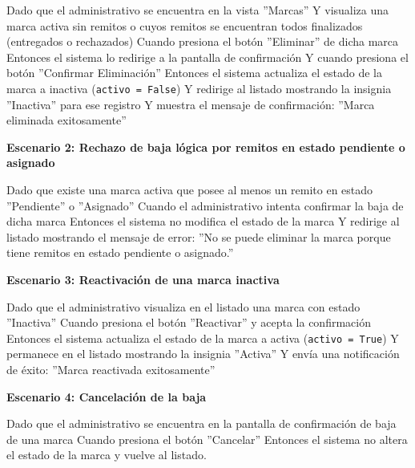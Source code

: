 \documentclass[a4paper,9pt]{article}
\begin{document}
\begin{tcolorbox}[hucard, title={\textbf{HU-242: ELIMINAR MARCA} \hfill \scriptsize \colorbox{slatestatus}{\textbf{\ Done\ }} \quad \colorbox{white}{\textcolor{primarydark}{\textbf{\ 3 pts\ }}}}]
{Dado que el administrativo se encuentra en la vista ''Marcas'' Y visualiza una marca activa sin remitos o cuyos remitos se encuentran todos finalizados (entregados o rechazados) Cuando presiona el botón ''Eliminar'' de dicha marca Entonces el sistema lo redirige a la pantalla de confirmación Y cuando presiona el botón ''Confirmar Eliminación'' Entonces el sistema actualiza el estado de la marca a inactiva (\texttt{activo = False}) Y redirige al listado mostrando la insignia ''Inactiva'' para ese registro Y muestra el mensaje de confirmación: ''Marca eliminada exitosamente''\par\vspace{2.5pt}
\noindent\textbf{\textcolor{secondarydark}{Escenario 2:  Rechazo de baja lógica por remitos en estado pendiente o asignado}}\par\vspace{1pt}
Dado que existe una marca activa que posee al menos un remito en estado ''Pendiente'' o ''Asignado'' Cuando el administrativo intenta confirmar la baja de dicha marca Entonces el sistema no modifica el estado de la marca Y redirige al listado mostrando el mensaje de error: ''No se puede eliminar la marca porque tiene remitos en estado pendiente o asignado.''\par\vspace{2.5pt}
\noindent\textbf{\textcolor{secondarydark}{Escenario 3:  Reactivación de una marca inactiva}}\par\vspace{1pt}
Dado que el administrativo visualiza en el listado una marca con estado ''Inactiva'' Cuando presiona el botón ''Reactivar'' y acepta la confirmación Entonces el sistema actualiza el estado de la marca a activa (\texttt{activo = True}) Y permanece en el listado mostrando la insignia ''Activa'' Y envía una notificación de éxito: ''Marca reactivada exitosamente''\par\vspace{2.5pt}
\noindent\textbf{\textcolor{secondarydark}{Escenario 4:  Cancelación de la baja}}\par\vspace{1pt}
Dado que el administrativo se encuentra en la pantalla de confirmación de baja de una marca Cuando presiona el botón ''Cancelar'' Entonces el sistema no altera el estado de la marca y vuelve al listado.\par\vspace{2.5pt}
}\par
\end{tcolorbox}
\end{document}
